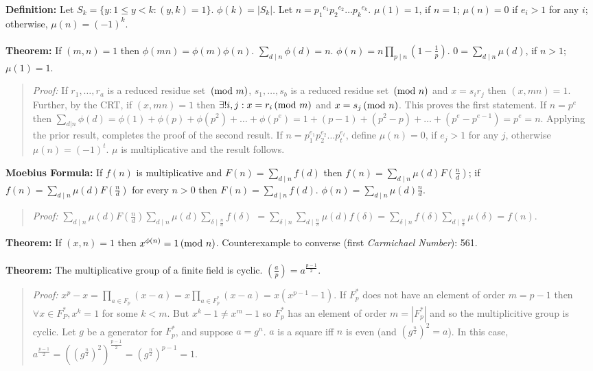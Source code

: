 {\bf Definition:} Let $S_k = \{y: 1 \leq y <k: (y,k)=1 \}$.  $\phi(k)= |S_k|$.  Let $n= {p_1}^{e_1} {p_2}^{e_2} \ldots {p_k}^{e_k}$.
$\mu(1)= 1$, if $n=1$; $\mu(n)=0$ if $e_i > 1$ for any $i$; otherwise, $\mu(n)= (-1)^k$.
\\
\\
{\bf Theorem:} 
If $(m,n)=1$ then $\phi(mn)= \phi(m) \phi(n)$.
$ \sum_{d \mid n} \phi(d)= n$.
$ \phi(n)=  n \prod_{p \mid n} (1- {\frac {1} {p}})$.
$ 0=  \sum_{d \mid n} \mu(d)$, if $n>1$; $\mu(1)=1$.
\begin{quote}
\emph{Proof:}
If $r_1, \ldots, r_a$ is a reduced residue set $\thinspace \textnormal{(mod } m \textnormal{)}$,
$s_1, \ldots , s_b$ is a reduced residue set $\thinspace \textnormal{(mod } n \textnormal{)}$ and
$x= s_i r_j$ then $(x,mn)=1$.  Further, by the CRT, if
$(x, mn)=1$ then $\exists ! i, j: x= r_i \thinspace \textnormal{(mod } m \textnormal{)}$ and $x= s_j \thinspace \textnormal{(mod } n \textnormal{)}$.  This proves
the first statement.  If $n= p^e$ then
$\sum_{d|n} \phi(d)= \phi(1) + \phi(p) + \phi(p^2) + \ldots + \phi(p^e)=
1 + (p-1) + (p^2-p) + \ldots + (p^e - p^{e-1})= p^e = n$.  Applying the prior result,
completes the proof of the second result.  If $n= p_1^{e_1} p_2^{e_2} \ldots p_t^{e_t}$,
define $\mu(n)=0$, if $e_j > 1$ for any $j$, otherwise $\mu(n)= (-1)^t$.  $\mu$ is
multiplicative and the result follows.
\end{quote}
{\bf Moebius Formula:} If $f(n)$ is multiplicative and 
$F(n)=  \sum_{d \mid n} f(d)$ then
$f(n)= \sum_{d \mid n} \mu(d) F({\frac {n} {d}})$;  if
$f(n)= \sum_{d \mid n} \mu(d) F({\frac {n} {d}})$ for every $n>0$ then
$F(n)=  \sum_{d \mid n} f(d)$.
$\phi(n)=  \sum_{d \mid n} \mu(d) {\frac {n} {d}}$.
\begin{quote}
\emph{Proof:}
$\sum_{d \mid n} \mu(d) F({\frac {n} {d}})
\sum_{d \mid n} \mu(d) \sum_{\delta  \mid  {\frac n d}} f(\delta)$
$=\sum_{\delta  \mid n} \sum_{d  \mid  {\frac n \delta}} \mu(d) f(\delta)=
\sum_{\delta  \mid n} f(\delta) \sum_{d  \mid  {\frac n \delta}} \mu(\delta) = f(n)$.
\end{quote}
{\bf Theorem:} If $(x,n)=1$ then $x^{\phi(n)}= 1 \thinspace \textnormal{(mod } n \textnormal{)}$.  Counterexample to converse
(first \emph{Carmichael Number}): 561.
\\
\\
{\bf Theorem:}
The multiplicative group of a finite field is cyclic.
$({\frac {a} {p}}) = a^{\frac {p-1} {2}}$.
\begin{quote}
\emph{Proof:}
$x^p-x = \prod_{a \in F_p} (x-a) = x \prod_{a \in F_p^*} (x-a) = x (x^{p-1} -1) $.
If $F_p^*$ does not have an element of order $m=p-1$ then $\forall x \in F_P^*, x^k = 1$
for some $k < m$. But $x^k-1 \ne x^m -1$ so $F_p^*$ has an element of order
$m = |F_p^*|$ and so the multiplicitive group is cyclic.  Let $g$ be a generator for
$F_p^*$, and suppose $a = g^n$.  $a$ is a square iff $n$ is even (and $(g^{\frac n 2})^2 = a$).
In this case, 
$a^{\frac {p-1} {2}}= ((g^{\frac n 2})^2)^{\frac {p-1} 2} = (g^{\frac n 2})^{p-1} = 1$.
\end{quote}
